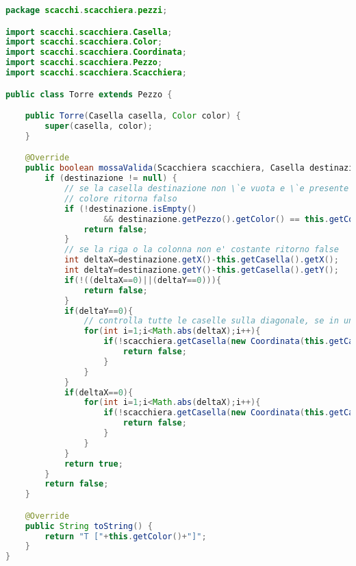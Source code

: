 \documentclass{article}
\begin{document}
\begin{lstlisting}[language=Java,escapechar=|]
package scacchi.scacchiera.pezzi;

import scacchi.scacchiera.Casella;
import scacchi.scacchiera.Color;
import scacchi.scacchiera.Coordinata;
import scacchi.scacchiera.Pezzo;
import scacchi.scacchiera.Scacchiera;

public class Torre extends Pezzo {

	public Torre(Casella casella, Color color) {
		super(casella, color);
	}

	@Override
	public boolean mossaValida(Scacchiera scacchiera, Casella destinazione) {
		if (destinazione != null) {
			// se la casella destinazione non \`e vuota e \`e presente un Pezzo dello stesso
			// colore ritorna falso
			if (!destinazione.isEmpty()
					&& destinazione.getPezzo().getColor() == this.getColor()) {
				return false;
			}
			// se la riga o la colonna non e' costante ritorno false
			int deltaX=destinazione.getX()-this.getCasella().getX();
			int deltaY=destinazione.getY()-this.getCasella().getY();
			if(!((deltaX==0)||(deltaY==0))){
				return false;
			}
			if(deltaY==0){
				// controlla tutte le caselle sulla diagonale, se in una di queste c'e' un pezzo ritorna false
				for(int i=1;i<Math.abs(deltaX);i++){
					if(!scacchiera.getCasella(new Coordinata(this.getCasella().getX() +i, this.getCasella().getY())).isEmpty()){
						return false;
					}
				}
			}
			if(deltaX==0){
				for(int i=1;i<Math.abs(deltaX);i++){
					if(!scacchiera.getCasella(new Coordinata(this.getCasella().getX(), this.getCasella().getY()+i)).isEmpty()){
						return false;
					}
				}
			}
			return true;
		}
		return false;
	}

	@Override
	public String toString() {
		return "T ["+this.getColor()+"]";
	}
}
\end{lstlisting}
\end{document}
